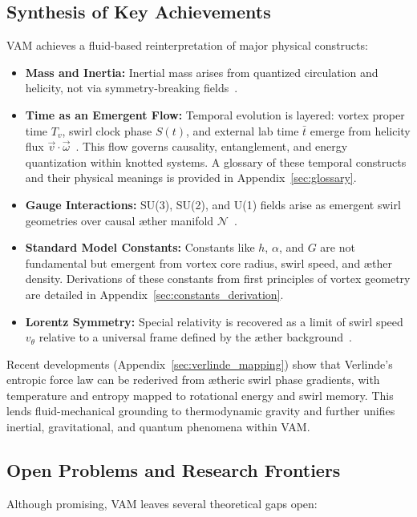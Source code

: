 \documentclass[preprint]{revtex4-2}
\begin{document}
    \subsection{Synthesis of Key Achievements}
    VAM achieves a fluid-based reinterpretation of major physical constructs:

    \begin{itemize}
        \item \textbf{Mass and Inertia:} Inertial mass arises from quantized circulation and helicity, not via symmetry-breaking fields~\cite{kleckner2013creation, volovik2003universe}.
        \item \textbf{Time as an Emergent Flow:} Temporal evolution is layered: vortex proper time $T_v$, swirl clock phase $S(t)$, and external lab time $\bar{t}$ emerge from helicity flux $\vec{v} \cdot \vec{\omega}$~\cite{volovik2003universe, ranada1990topological}. This flow governs causality, entanglement, and energy quantization within knotted systems. A glossary of these temporal constructs and their physical meanings is provided in Appendix~\ref{sec:glossary}.
        \item \textbf{Gauge Interactions:} SU(3), SU(2), and U(1) fields arise as emergent swirl geometries over causal æther manifold $\mathcal{N}$~\cite{moffatt1969knottedness}.
        \item \textbf{Standard Model Constants:} Constants like $h$, $\alpha$, and $G$ are not fundamental but emergent from vortex core radius, swirl speed, and æther density.     Derivations of these constants from first principles of vortex geometry are detailed in Appendix~\ref{sec:constants_derivation}.
        \item \textbf{Lorentz Symmetry:} Special relativity is recovered as a limit of swirl speed $v_\theta$ relative to a universal frame defined by the æther background~\cite{volovik2003universe}.
    \end{itemize}

        Recent developments (Appendix~\ref{sec:verlinde_mapping}) show that Verlinde’s entropic force law can be rederived from ætheric swirl phase gradients, with temperature and entropy mapped to rotational energy and swirl memory. This lends fluid-mechanical grounding to thermodynamic gravity and further unifies inertial, gravitational, and quantum phenomena within VAM.

    \subsection{Open Problems and Research Frontiers}
    Although promising, VAM leaves several theoretical gaps open:
\end{document}
